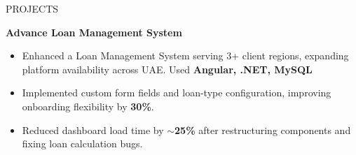 \documentclass{resume} %
\begin{document}
\begin{rSection}{PROJECTS}
\item \textbf{Advance Loan Management System} 
\begin{itemize}
\vspace{-0.5em}
    \item Enhanced a Loan Management System serving 3+ client regions, expanding platform availability across UAE. Used \textbf{Angular, .NET, MySQL}
    \vspace{-0.5em}
    \item Implemented custom form fields and loan-type configuration, improving onboarding flexibility by \textbf{30\%}.
    \vspace{-0.5em}
    \item Reduced dashboard load time by \textbf{\(\sim \)25\%} after restructuring components and fixing loan calculation bugs.
    \vspace{-0.5em}
\end{itemize}


 





\end{rSection}
\end{document}
